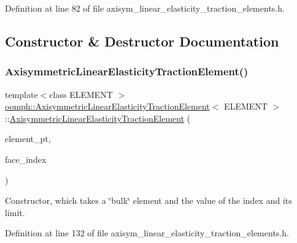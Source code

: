 Definition at line 82 of file axisym\+\_\+linear\+\_\+elasticity\+\_\+traction\+\_\+elements.\+h.



\subsection{Constructor \& Destructor Documentation}
\mbox{\label{classoomph_1_1AxisymmetricLinearElasticityTractionElement_a9b68dc55eee5ecabeaaab18d47af9008}} 
\subsubsection{\texorpdfstring{Axisymmetric\+Linear\+Elasticity\+Traction\+Element()}{AxisymmetricLinearElasticityTractionElement()}}
{\footnotesize\ttfamily template$<$class E\+L\+E\+M\+E\+NT $>$ \\
\hyperlink{classoomph_1_1AxisymmetricLinearElasticityTractionElement}{oomph\+::\+Axisymmetric\+Linear\+Elasticity\+Traction\+Element}$<$ E\+L\+E\+M\+E\+NT $>$\+::\hyperlink{classoomph_1_1AxisymmetricLinearElasticityTractionElement}{Axisymmetric\+Linear\+Elasticity\+Traction\+Element} (\begin{DoxyParamCaption}\item[{\hyperlink{classoomph_1_1FiniteElement}{Finite\+Element} $\ast$const \&}]{element\+\_\+pt,  }\item[{const int \&}]{face\+\_\+index }\end{DoxyParamCaption})\hspace{0.3cm}{\ttfamily [inline]}}



Constructor, which takes a \char`\"{}bulk\char`\"{} element and the value of the index and its limit. 



Definition at line 132 of file axisym\+\_\+linear\+\_\+elasticity\+\_\+traction\+\_\+elements.\+h.



